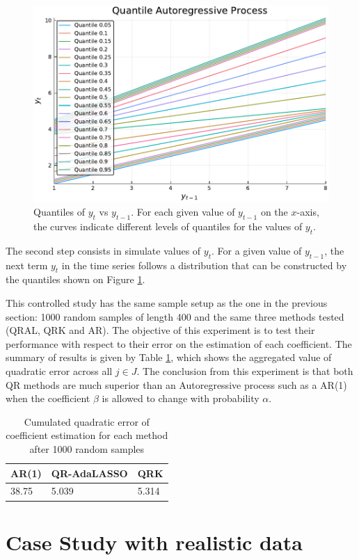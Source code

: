 \begin{figure}[h]
	\centering
	\centerline{\includegraphics[width=0.8\linewidth]{Images/Qar.pdf}}
	\caption{Quantiles of $y_t$ vs $y_{t-1}$. For each given value of $y_{t-1}$ on the $x$-axis, the curves indicate different levels of quantiles for the values of $y_t$.}
	\label{fig:qar}
\end{figure}

The second step consists in simulate values of $y_t$. For a given value of $y_{t-1}$, the next term $y_t$ in the time series follows a distribution that can be constructed by the quantiles shown on Figure \ref{fig:qar}. 

This controlled study has the same sample setup as the one in the previous section: 1000 random samples of length 400 and the same three methods tested (QRAL, QRK and AR). The objective of this experiment is to test their performance with respect to their error on the estimation of each coefficient. The summary of results is given by Table \ref{tab:qar-results}, which shows the aggregated value of quadratic error across all $j \in J$.
The conclusion from this experiment is that both QR methods are much superior than an Autoregressive process such as a AR(1) when the coefficient $\beta$ is allowed to change with probability $\alpha$. 


\begin{table}[h]
\centering
\caption{Cumulated quadratic error of coefficient estimation for each method after 1000 random samples}
\label{tab:qar-results}
\begin{tabular}{lll}
\hline
AR(1) & QR-AdaLASSO & QRK   \\ \hline
38.75 & 5.039       & 5.314
\end{tabular}
\end{table}

\section{Case Study with realistic data}

